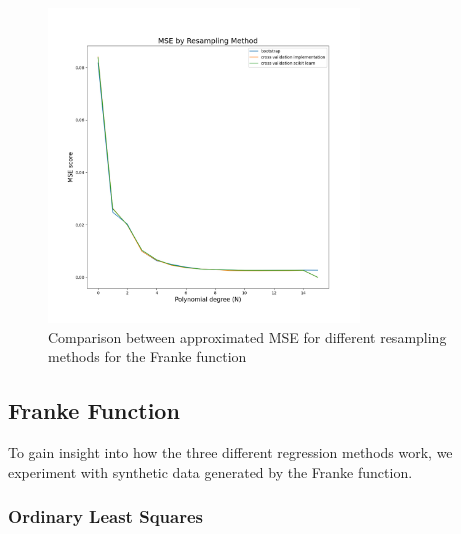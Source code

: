 \documentclass[twocolumn,10pt,cleanfoot]{asme2ej}
\begin{document}
\begin{figure}[h]
\centerline{\includegraphics[width=3.25in]{figure/frankemsebyresamplingmethod.png}}
\caption{Comparison between approximated MSE for different resampling methods for the Franke function}
\label{frankemsebyresamplingmethod}
\end{figure}


\subsection{Franke Function}

To gain insight into how the three different regression methods work, we experiment with synthetic data generated by the Franke function.

\subsubsection{Ordinary Least Squares}
\end{document}

